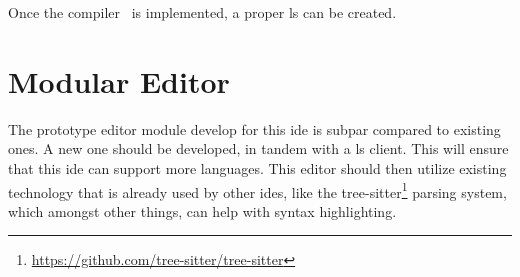 Once the compiler~\cite{wiig} is implemented, a proper \gls*{ls} can be created.

\section{Modular Editor}

The prototype editor module develop for this \gls*{ide} is subpar compared to
existing ones. A new one should be developed, in tandem with a \gls*{ls} client.
This will ensure that this \gls*{ide} can support more languages. This editor
should then utilize existing technology that is already used by other
\gls*{ide}s, like the tree-sitter\footnote{\url{https://github.com/tree-sitter/tree-sitter}}
parsing system, which amongst other things, can help with syntax highlighting.
